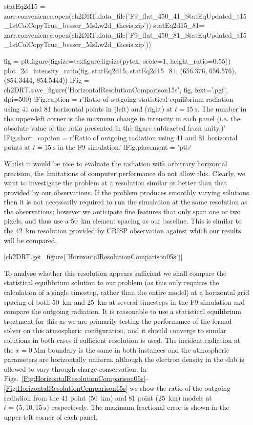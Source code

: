 \begin{pycode}[2DRT]
statEq2d15 = zarr.convenience.open(ch2DRT.data_file('F9_flat_450_41_StatEqUpdated_t15_1stColCopyTrue_besser_MsLw2d_thesis.zip'))
statEq2d15_81= zarr.convenience.open(ch2DRT.data_file('F9_flat_450_81_StatEqUpdated_t15_1stColCopyTrue_besser_MsLw2d_thesis.zip'))

fig = plt.figure(figsize=texfigure.figsize(pytex, scale=1, height_ratio=0.55))
plot_2d_intensity_ratio(fig, statEq2d15, statEq2d15_81, (656.376, 656.576), (854.3444, 854.5444))
lFig = ch2DRT.save_figure('HorizontalResolutionComparison15s', fig, fext='.pgf', dpi=500)
lFig.caption = r'Ratio of outgoing statistical equilibrium radiation using 41 and 81 horizontal points in \Ha{} (left) and \CaLine{} (right) at $t=\SI{15}{\second}$. The number in the upper-left corner is the maxmum change in intensity in each panel (i.e. the absolute value of the ratio presented in the figure subtracted from unity.)'
lFig.short_caption = r'Ratio of outgoing radiation using 41 and 81 horizontal points at $t=\SI{15}{\second}$ in the F9 simulation.'
lFig.placement = 'ptb'

\end{pycode}


Whilst it would be nice to evaluate the radiation with arbitrary horizontal precision, the limitations of computer performance do not allow this.
Clearly, we want to investigate the problem at a resolution similar or better than that provided by our observations.
If the problem produces smoothly varying solutions then it is not necessarily required to run the simulation at the same resolution as the observations; however we anticipate fine features that only span one or two pixels, and thus use a \SI{50}{\kilo\metre} element spacing as our baseline.
This is similar to the \SI{42}{\kilo\metre} resolution provided by CRISP observation against which our results will be compared.

\py[2DRT]|ch2DRT.get_figure('HorizontalResolutionComparison05s')|

To analyse whether this resolution appears sufficient we shall compare the statistical equilibrium solution to our problem (as this only requires the calculation of a single timestep, rather than the entire model) at a horizontal grid spacing of both \SI{50}{\kilo\metre} and \SI{25}{\kilo\metre} at several timesteps in the F9 simulation and compare the outgoing radiation.
It is reasonable to use a statistical equilibrium treatment for this as we are primarily testing the performance of the formal solver on this atmospheric configuration, and it should converge to similar solutions in both cases if sufficient resolution is used.
The incident radiation at the $x=\SI{0}{\mega\metre}$ boundary is the same in both instances and the atmospheric parameters are horizontally uniform, although the electron density in the slab is allowed to vary through charge conservation.
In Figs.~\ref{Fig:HorizontalResolutionComparison05s}--\ref{Fig:HorizontalResolutionComparison15s} we show the ratio of the outgoing radiation from the 41 point (\SI{50}{\kilo\metre}) and 81 point (\SI{25}{\kilo\metre}) models at $t=\{5, 10, \SI{15}{\second}\}$ respectively.
The maximum fractional error is shown in the upper-left corner of each panel.

